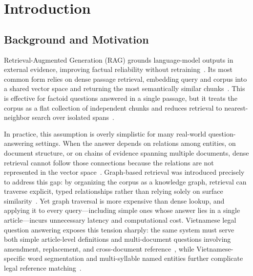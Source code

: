 ﻿\documentclass[11pt,twocolumn]{article}
\begin{document}
\section{Introduction}
\label{sec:intro}

\subsection{Background and Motivation}

Retrieval-Augmented Generation (RAG) grounds language-model outputs in
external evidence, improving factual reliability without
retraining~\cite{lewis2020rag,guu2020realm}. Its most common form relies
on dense passage retrieval, embedding query and corpus into a shared
vector space and returning the most semantically similar
chunks~\cite{karpukhin2020dpr}. This is effective for factoid questions
answered in a single passage, but it treats the corpus as a flat
collection of independent chunks and reduces retrieval to nearest-neighbor
search over isolated spans~\cite{karpukhin2020dpr,trivedi2023interleaving}.

In practice, this assumption is overly simplistic for many real-world
question-answering settings. When the answer depends on relations among
entities, on document structure, or on chains of evidence spanning
multiple documents, dense retrieval cannot follow those connections
because the relations are not represented in the vector
space~\cite{trivedi2023interleaving}. Graph-based retrieval was introduced
precisely to address this gap: by organizing the corpus as a knowledge
graph, retrieval can traverse explicit, typed relationships rather than
relying solely on surface
similarity~\cite{edge2024graphrag,wang2024kgp,gutierrez2024hipporag}. Yet
graph traversal is more expensive than dense lookup, and applying it to
every query---including simple ones whose answer lies in a single
article---incurs unnecessary latency and computational cost. Vietnamese
legal question answering exposes this tension sharply: the same system
must serve both simple article-level definitions and multi-document
questions involving amendment, replacement, and cross-document
reference~\cite{chalkidis2020legalbert,zhong2020nlp_law,sovrano2020legalkg},
while Vietnamese-specific word segmentation and multi-syllable named
entities further complicate legal reference
matching~\cite{nguyen2020phobert,vu2018vncorenlp}.
\end{document}
